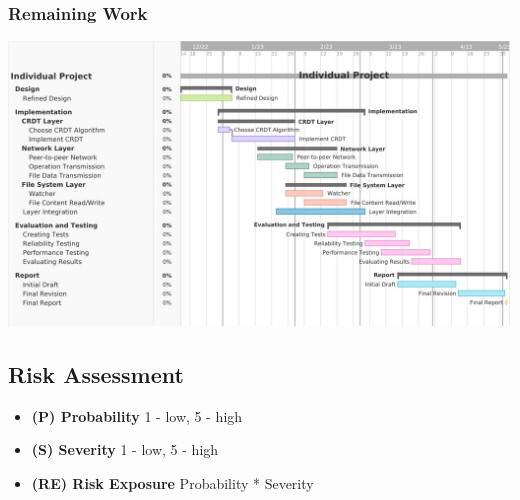 \documentclass[12pt]{article}
\begin{document}
\subsubsection{Remaining Work}
\begin{center}
    \includegraphics[width=16cm]{remaining.jpg}
\end{center}


\subsection{Risk Assessment}

\begin{itemize}
    \item \textbf{(P) Probability} 1 - low, 5 - high
    \item \textbf{(S) Severity}  1 - low, 5 - high
    \item \textbf{(RE) Risk Exposure} Probability * Severity
\end{itemize}
\end{document}
